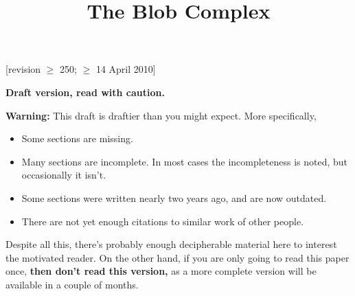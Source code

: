\documentclass[11pt,leqno]{amsart}
\title{The Blob Complex}
\begin{document}
\makeatletter
{}
\gdef\theequation{\thesection.\arabic{equation}}
\makeatother

\maketitle


[revision $\ge$ 250;  $\ge$ 14 April 2010]

\textbf{Draft version, read with caution.}

\medskip


\noindent
{\bf Warning:} This draft is draftier than you might expect.
More specifically,
\begin{itemize}
\item Some sections are missing.
\item Many sections are incomplete.
In most cases the incompleteness is noted, but occasionally it isn't.
\item Some sections were written nearly two years ago, and are now outdated.
\item There are not yet enough citations to similar work of other people.
\end{itemize}
Despite all this, there's probably enough decipherable material
here to interest the motivated reader.
On the other hand, if you are only going to read this paper once,
{\bf then don't read this version,} as a more complete version will be available in a couple of months.






%


















\appendix


\end{document}
